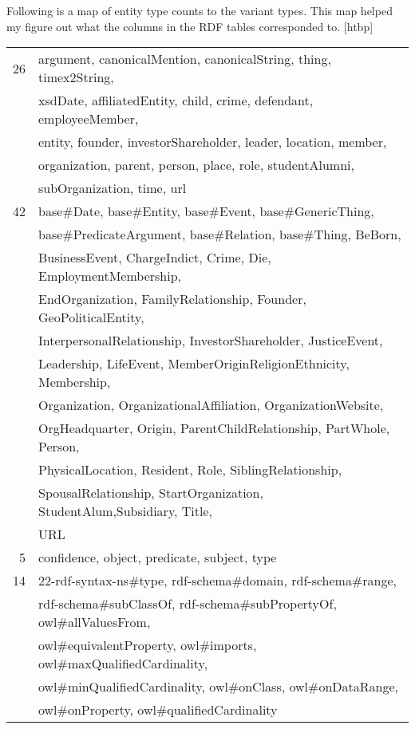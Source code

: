 \documentclass{tufte-handout}
\makeatletter
\renewenvironment{table}[1][htbp]{%
\@tufte@orig@float{table}[#1]}{%
\@tufte@orig@endfloat}%
\makeatother
\begin{document}
Following is a map of entity type counts to the variant types. This map helped
my figure out what the columns in the RDF tables corresponded to.
\begin{table}[htbp]
  \centering
  \begin{tabular}{r l}
    26 & argument, canonicalMention, canonicalString, thing, timex2String, \\
       &  xsdDate, affiliatedEntity, child, crime, defendant, employeeMember, \\
       &  entity, founder, investorShareholder, leader, location, member, \\
       &  organization, parent, person, place, role, studentAlumni, \\
       &  subOrganization, time, url \\\midrule
    42 & base\#Date, base\#Entity, base\#Event, base\#GenericThing, \\
       &  base\#PredicateArgument, base\#Relation, base\#Thing, BeBorn,\\
       &  BusinessEvent, ChargeIndict, Crime, Die, EmploymentMembership,\\
       &  EndOrganization, FamilyRelationship, Founder, GeoPoliticalEntity,\\
       &  InterpersonalRelationship, InvestorShareholder, JusticeEvent,\\
       &  Leadership, LifeEvent, MemberOriginReligionEthnicity, Membership,\\
       &  Organization, OrganizationalAffiliation, OrganizationWebsite,\\
       &  OrgHeadquarter, Origin, ParentChildRelationship, PartWhole, Person,\\
       &  PhysicalLocation, Resident, Role, SiblingRelationship,\\
       &  SpousalRelationship, StartOrganization, StudentAlum,Subsidiary, Title,\\
       &  URL \\\midrule
    5  & confidence, object, predicate, subject, type \\\midrule
    14 & 22-rdf-syntax-ns\#type, rdf-schema\#domain, rdf-schema\#range,\\
       &  rdf-schema\#subClassOf, rdf-schema\#subPropertyOf, owl\#allValuesFrom,\\
       &  owl\#equivalentProperty, owl\#imports, owl\#maxQualifiedCardinality,\\
       &  owl\#minQualifiedCardinality, owl\#onClass, owl\#onDataRange,\\
       &  owl\#onProperty, owl\#qualifiedCardinality
  \end{tabular}
  \caption{Count to Variant Map}
  \label{tab:count-to-variant}
\end{table}
\end{document}

